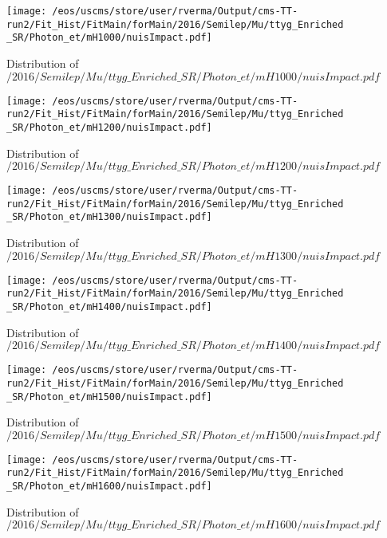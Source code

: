 \begin{figure}
\centering
\texttt{[image: /eos/uscms/store/user/rverma/Output/cms-TT-run2/Fit\_Hist/FitMain/forMain/2016/Semilep/Mu/ttyg\_Enriched\_SR/Photon\_et/mH1000/nuisImpact.pdf]}
\caption{Distribution of $/2016/Semilep/Mu/ttyg\_Enriched\_SR/Photon\_et/mH1000/nuisImpact.pdf$}
\end{figure}

\begin{figure}
\centering
\texttt{[image: /eos/uscms/store/user/rverma/Output/cms-TT-run2/Fit\_Hist/FitMain/forMain/2016/Semilep/Mu/ttyg\_Enriched\_SR/Photon\_et/mH1200/nuisImpact.pdf]}
\caption{Distribution of $/2016/Semilep/Mu/ttyg\_Enriched\_SR/Photon\_et/mH1200/nuisImpact.pdf$}
\end{figure}

\begin{figure}
\centering
\texttt{[image: /eos/uscms/store/user/rverma/Output/cms-TT-run2/Fit\_Hist/FitMain/forMain/2016/Semilep/Mu/ttyg\_Enriched\_SR/Photon\_et/mH1300/nuisImpact.pdf]}
\caption{Distribution of $/2016/Semilep/Mu/ttyg\_Enriched\_SR/Photon\_et/mH1300/nuisImpact.pdf$}
\end{figure}

\begin{figure}
\centering
\texttt{[image: /eos/uscms/store/user/rverma/Output/cms-TT-run2/Fit\_Hist/FitMain/forMain/2016/Semilep/Mu/ttyg\_Enriched\_SR/Photon\_et/mH1400/nuisImpact.pdf]}
\caption{Distribution of $/2016/Semilep/Mu/ttyg\_Enriched\_SR/Photon\_et/mH1400/nuisImpact.pdf$}
\end{figure}

\begin{figure}
\centering
\texttt{[image: /eos/uscms/store/user/rverma/Output/cms-TT-run2/Fit\_Hist/FitMain/forMain/2016/Semilep/Mu/ttyg\_Enriched\_SR/Photon\_et/mH1500/nuisImpact.pdf]}
\caption{Distribution of $/2016/Semilep/Mu/ttyg\_Enriched\_SR/Photon\_et/mH1500/nuisImpact.pdf$}
\end{figure}

\begin{figure}
\centering
\texttt{[image: /eos/uscms/store/user/rverma/Output/cms-TT-run2/Fit\_Hist/FitMain/forMain/2016/Semilep/Mu/ttyg\_Enriched\_SR/Photon\_et/mH1600/nuisImpact.pdf]}
\caption{Distribution of $/2016/Semilep/Mu/ttyg\_Enriched\_SR/Photon\_et/mH1600/nuisImpact.pdf$}
\end{figure}

